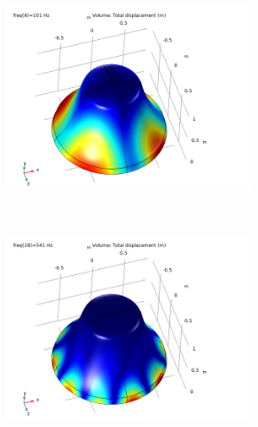 \documentclass[a4paper]{article}
\begin{document}
\begin{figure}[h!]
	\centering
	\begin{subfigure}{0.47\textwidth}
		\includegraphics[width=0.8\textwidth]{frequency modal study/B1.png}
	\end{subfigure}
	~
	\begin{subfigure}{0.47\textwidth}
		\includegraphics[width=0.8\textwidth]{frequency modal study/B2.png}
	\end{subfigure}
	

\end{figure}
\end{document}
